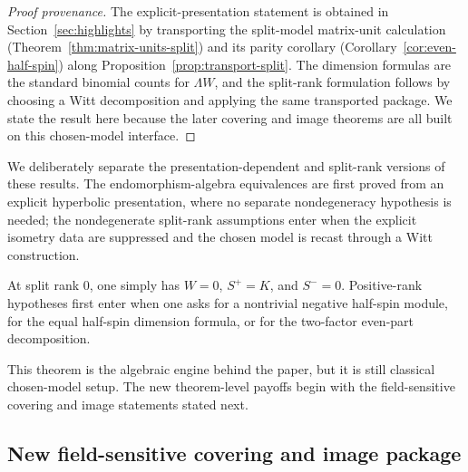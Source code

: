 \documentclass{birkjour}
\theoremstyle{plain}
\theoremstyle{definition}
\theoremstyle{remark}
\newcommand{\wedgeW}{\Lambda W}
\begin{document}
\begin{proof}[Proof provenance]
The explicit-presentation statement is obtained in
Section~\ref{sec:highlights} by transporting the split-model matrix-unit
calculation (Theorem~\ref{thm:matrix-units-split}) and its parity corollary
(Corollary~\ref{cor:even-half-spin}) along
Proposition~\ref{prop:transport-split}. The dimension formulas are the standard
binomial counts for $\wedgeW$, and the split-rank formulation follows by
choosing a Witt decomposition and applying the same transported package. We
state the result here because the later covering and image theorems are all
built on this chosen-model interface.
\end{proof}

We deliberately separate the presentation-dependent and split-rank
versions of these results. The endomorphism-algebra equivalences are
first proved from an explicit hyperbolic presentation, where no separate
nondegeneracy hypothesis is needed; the nondegenerate split-rank assumptions
enter when the explicit isometry data are suppressed and the chosen model is
recast through a Witt construction.

At split rank $0$, one simply has $W=0$, $S^+=K$, and $S^-=0$. Positive-rank
hypotheses first enter when one asks for a nontrivial negative half-spin module,
for the equal half-spin dimension formula, or for the two-factor even-part
decomposition.

This theorem is the algebraic engine behind the paper, but it is still
classical chosen-model setup. The new theorem-level payoffs begin with the
field-sensitive covering and image statements stated next.

\subsection*{New field-sensitive covering and image package}
\end{document}
